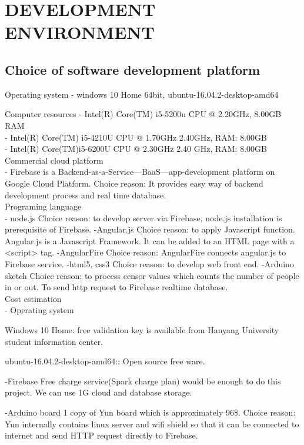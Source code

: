 \documentclass[journal]{IEEEtran}
\begin{document}

\section{DEVELOPMENT ENVIRONMENT}

\subsection{Choice of software development platform}
Operating system
- windows 10 Home 64bit, ubuntu-16.04.2-desktop-amd64

Computer resources
- Intel(R) Core(TM) i5-5200u CPU @ 2.20GHz, 8.00GB RAM\\
- Intel(R) Core(TM) i5-4210U CPU @ 1.70GHz 2.40GHz,  RAM: 8.00GB\\
- Intel(R) Core(TM)i5-6200U CPU @ 2.30GHz 2.40 GHz, RAM: 8.00GB\\

Commercial cloud platform\\
- Firebase is a Backend-as-a-Service—BaaS—app-development platform on Google Cloud Platform.
Choice reason: It provides easy way of backend development process and real time database.\\


Programing language\\
- node.js 
Choice reason: to develop server via Firebase, node.js installation is prerequisite of Firebase.
-Angular.js
Choice reason: to apply Javascript function. Angular.js is  a Javascript Framework. It can be added to an HTML page with a <script> tag.
-AngularFire 
Choice reason: AngularFire connects angular.js to Firebase service.
-html5, css3
Choice reason: to develop web front end.
-Arduino sketch
Choice reason: to process censor values which counts the number of people in or out. To send http request to Firebase realtime database.\\

Cost estimation\\
- Operating system

Windows 10 Home: free validation key is available from Hanyang University student information center.

ubuntu-16.04.2-desktop-amd64:: Open source free ware.

-Firebase
Free charge service(Spark charge plan) would be enough to do this project. We can use 1G cloud and database storage.

-Arduino board
1 copy of Yun board which is approximately 96\$. 
Choice reason: Yun internally contains linux server and wifi shield so that it can be connected to internet and send HTTP request directly to Firebase.
\end{document}
